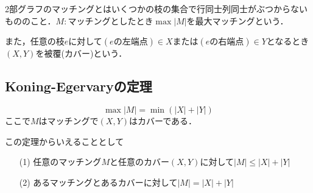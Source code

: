 2部グラフのマッチングとはいくつかの枝の集合で行同士列同士がぶつからないもののこと．$M:マッチング$としたとき$\max |M|$を最大マッチングという．

また，任意の枝$e$に対して$(eの左端点)\in X$または$(eの右端点)\in Y$となるとき$(X,Y)$を被覆(カバー)という．
\subsection{Koning-Egervaryの定理}
\begin{equation}
  \max |M|=\min (|X|+|Y|)
\end{equation}
ここで$M$はマッチングで$(X,Y)$はカバーである．

この定理からいえることとして
\begin{itemize}
  \item[(1)]任意のマッチング$M$と任意のカバー$(X,Y)$に対して$|M|\leq |X|+|Y|$\\
  \item[(2)]あるマッチングとあるカバーに対して$|M|=|X|+|Y|$
\end{itemize}

